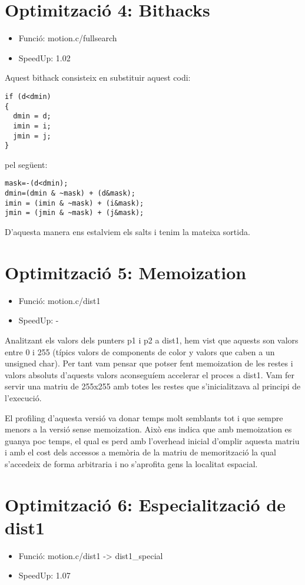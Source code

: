 \section{Optimitzaci\'o 4: Bithacks}
\begin{itemize}
\item{Funció: motion.c/fullsearch}
\item{SpeedUp:  1.02}
\end{itemize}

Aquest bithack consisteix en substituir aquest codi:

\begin{lstlisting}
if (d<dmin)
{
  dmin = d;
  imin = i;
  jmin = j;
}
\end{lstlisting}

pel següent:

\begin{lstlisting}
mask=-(d<dmin);
dmin=(dmin & ~mask) + (d&mask);
imin = (imin & ~mask) + (i&mask);
jmin = (jmin & ~mask) + (j&mask);
\end{lstlisting}

D'aquesta manera ens estalviem els salts i tenim la mateixa sortida.

\section{Optimitzaci\'o 5: Memoization}
\begin{itemize}
\item{Funció: motion.c/dist1}
\item{SpeedUp: -}
\end{itemize}

Analitzant els valors dels punters p1 i p2 a dist1, hem vist que aquests son valors entre 0 i 255  (típics valors de components de color y valors que caben a un unsigned char). Per tant vam pensar que potser fent memoization de les restes i valors absoluts d'aquests valors aconseguíem accelerar el proces a dist1. Vam fer servir una matriu de 255x255 amb totes les restes que s'inicialitzava al principi de l'execució. 

El profiling d'aquesta versió va donar temps molt semblants tot i que sempre menors a la versió sense memoization. Això ens indica que amb memoization es guanya poc temps, el qual es perd amb l'overhead inicial d'omplir aquesta matriu i amb el cost dels accessos a memòria de la matriu de memorització la qual s'accedeix de forma arbitraria i no s'aprofita gens la localitat espacial.

\section{Optimitzaci\'o 6: Especialitzaci\'o de dist1}
\begin{itemize}
\item{Funció: motion.c/dist1 -> dist1\_special}
\item{SpeedUp: 1.07}
\end{itemize}

